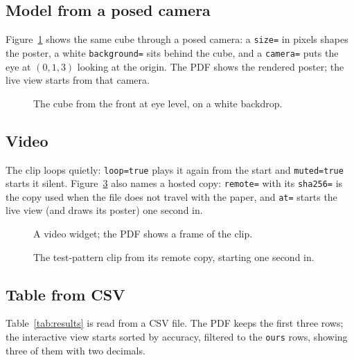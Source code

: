 \documentclass{article}
\theoremstyle{definition}
\begin{document}
\subsection{Model from a posed camera}
Figure~\ref{fig:model-pose} shows the same cube through a posed camera: a
\texttt{size=} in pixels shapes the poster, a white \texttt{background=}
sits behind the cube, and a \texttt{camera=} puts the eye at $(0,1,3)$
looking at the origin. The PDF shows the rendered poster; the live view
starts from that camera.
\begin{figure}[ht]
\centering
\caption{The cube from the front at eye level, on a white backdrop.}
\label{fig:model-pose}
\end{figure}

\subsection{Video}
The clip loops quietly: \texttt{loop=true} plays it again from the start
and \texttt{muted=true} starts it silent. Figure~\ref{fig:video-remote} also
names a hosted copy: \texttt{remote=} with its \texttt{sha256=} is the copy
used when the file does not travel with the paper, and \texttt{at=} starts
the live view (and draws its poster) one second in.
\begin{figure}[ht]
\centering
\caption{A video widget; the PDF shows a frame of the clip.}
\label{fig:video}
\end{figure}
\begin{figure}[ht]
\centering
\caption{The test-pattern clip from its remote copy, starting one second in.}
\label{fig:video-remote}
\end{figure}

\subsection{Table from CSV}
Table~\ref{tab:results} is read from a CSV file. The PDF keeps the first
three rows; the interactive view starts sorted by accuracy, filtered to the
\texttt{ours} rows, showing three of them with two decimals.
\begin{table}[ht]
\centering
\caption{Accuracy and latency for each configuration.}
\label{tab:results}
\end{table}
\end{document}
